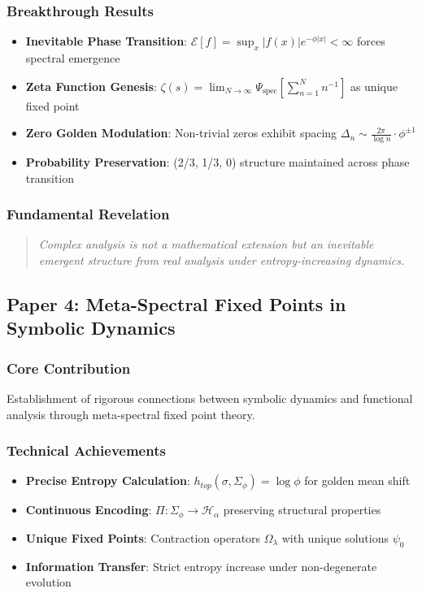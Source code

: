\documentclass[12pt]{article}
\theoremstyle{plain}
\theoremstyle{definition}
\begin{document}
\subsubsection{Breakthrough Results}
\begin{itemize}
\item \textbf{Inevitable Phase Transition}: $\mathcal{E}[f] = \sup_x |f(x)| e^{-\phi|x|} < \infty$ forces spectral emergence
\item \textbf{Zeta Function Genesis}: $\zeta(s) = \lim_{N \to \infty} \Psi_{\text{spec}}[\sum_{n=1}^N n^{-1}]$ as unique fixed point
\item \textbf{Zero Golden Modulation}: Non-trivial zeros exhibit spacing $\Delta_n \sim \frac{2\pi}{\log n} \cdot \phi^{\pm 1}$
\item \textbf{Probability Preservation}: (2/3, 1/3, 0) structure maintained across phase transition
\end{itemize}

\subsubsection{Fundamental Revelation}
\begin{quote}
\emph{Complex analysis is not a mathematical extension but an inevitable emergent structure from real analysis under entropy-increasing dynamics.}
\end{quote}

\subsection{Paper 4: Meta-Spectral Fixed Points in Symbolic Dynamics}

\subsubsection{Core Contribution}
Establishment of rigorous connections between symbolic dynamics and functional analysis through meta-spectral fixed point theory.

\subsubsection{Technical Achievements}
\begin{itemize}
\item \textbf{Precise Entropy Calculation}: $h_{top}(\sigma, \Sigma_\phi) = \log \phi$ for golden mean shift
\item \textbf{Continuous Encoding}: $\Pi: \Sigma_\phi \to \mathcal{H}_\alpha$ preserving structural properties
\item \textbf{Unique Fixed Points}: Contraction operators $\Omega_\lambda$ with unique solutions $\psi_0$
\item \textbf{Information Transfer}: Strict entropy increase under non-degenerate evolution
\end{itemize}
\end{document}
